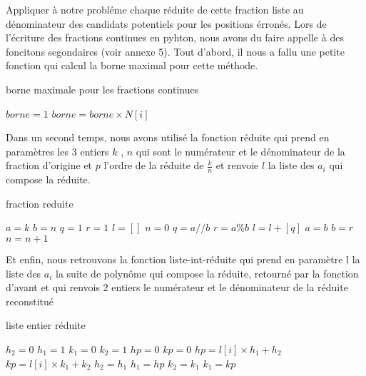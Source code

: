 \documentclass[a4paper, 11pt]{report}
\begin{document}
Appliquer à notre probléme chaque réduite de cette fraction liste au dénominateur des candidats potentiels pour les positions érronés.\newline
Lors de l'écriture des fractions continues en pyhton, nous avons du faire appelle à des foncitons segondaires (voir annexe 5). Tout d'abord, il nous a fallu une petite fonction qui calcul la borne maximal pour cette méthode.
\begin{algorithm}
    \caption{borne maximale pour les fractions continues}
    \begin{algorithmic}
        \STATE $borne=1$
        \STATE $borne=borne\times N[i]$
        \ENDFOR
    \end{algorithmic}
\end{algorithm}    
\newpage
Dans un second temps, nous avons utilisé la fonction réduite qui prend en paramètres les 3 entiers 
$k$ , $n$ qui sont le numérateur et le dénominateur de la fraction d'origine et $p$ l'ordre de la réduite de $\frac{k}{n}$ et renvoie $l$ la liste des $a_i$ qui compose la réduite. \newline
\begin{algorithm}
    \caption{fraction reduite}
    \begin{algorithmic}
        \STATE $a=k$
        \STATE $b=n$
        \STATE $q=1$
        \STATE $r=1$
        \STATE $l=[]$
        \STATE $n=0$
        \STATE $q=a//b$
        \STATE $r=a\%b$
        \STATE $l=l+[q]$
        \STATE $a=b$
        \STATE $b=r$
        \STATE $n=n+1$
        \ENDIF
        \ENDWHILE
    \end{algorithmic}
\end{algorithm}


Et enfin, nous retrouvons la fonction liste-int-réduite qui prend en paramètre l la liste des $a_i$ la suite de polynôme qui compose la réduite, 
retourné par la fonction d'avant et qui renvois 2 entiers le numérateur et le dénominateur de la réduite reconstitué
\begin{algorithm}
    \caption{liste entier réduite}
    \begin{algorithmic}
        \STATE $h_2=0$
        \STATE $h_1=1$
        \STATE $k_1=0$
        \STATE $k_2=1$
        \STATE $hp=0$
        \STATE $kp=0$
        \STATE $hp=l[i]\times h_1+h_2$
        \STATE $kp=l[i]\times k_1+k_2$
        \STATE $h_2=h_1$
        \STATE $h_1=hp$
        \STATE $k_2=k_1$
        \STATE $k_1=kp$
        \ENDFOR
    \end{algorithmic}
\end{algorithm}
\end{document}

